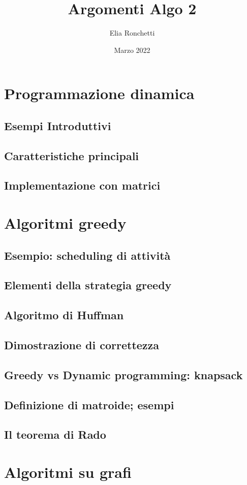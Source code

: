 \documentclass[12pt, a4paper, openany]{book}
\begin{document}
\title{Argomenti Algo 2}
\author{Elia Ronchetti}
\date{Marzo 2022}

\maketitle
\tableofcontents

\chapter{Programmazione dinamica}
\section{Esempi Introduttivi}
\section{Caratteristiche principali}
\section{Implementazione con matrici}

\chapter{Algoritmi greedy}
\section{Esempio: scheduling di attività}
\section{Elementi della strategia greedy}
\section{Algoritmo di Huffman}
\section{Dimostrazione di correttezza}
\section{Greedy vs Dynamic programming: knapsack}
\section{Definizione di matroide; esempi}
\section{Il teorema di Rado}

\chapter{Algoritmi su grafi}
\end{document}
